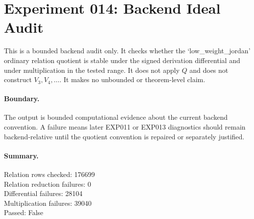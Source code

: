 \documentclass{article}
\begin{document}
\section*{Experiment 014: Backend Ideal Audit}
This is a bounded backend audit only. It checks whether the `low\_weight\_jordan' ordinary relation quotient is stable under the signed derivation differential and under multiplication in the tested range. It does not apply $Q$ and does not construct $V_3,V_4,\ldots$. It makes no unbounded or theorem-level claim.
\paragraph{Boundary.}
The output is bounded computational evidence about the current backend convention. A failure means later EXP011 or EXP013 diagnostics should remain backend-relative until the quotient convention is repaired or separately justified.
\paragraph{Summary.}
Relation rows checked: 176699\\ Relation reduction failures: 0\\ Differential failures: 28104\\ Multiplication failures: 39040\\ Passed: False
\end{document}
